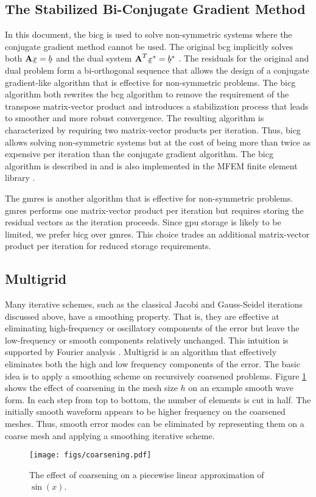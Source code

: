 \documentclass[../doc.tex]{subfiles}
\begin{document}
\subsection{The Stabilized Bi-Conjugate Gradient Method}
In this document, the \gls{bicg} is used to solve non-symmetric systems where the conjugate gradient method cannot be used. The original \gls{bcg} \cite{bicg,10.1007/BFb0080116} implicitly solves both $\mat{A}\ubar{x} = \ubar{b}$ and the dual system $\mat{A}^T \ubar{x}^* = \ubar{b}^*$ \cite{saad}. The residuals for the original and dual problem form a bi-orthogonal sequence that allows the design of a conjugate gradient-like algorithm that is effective for non-symmetric problems. The \gls{bicg} algorithm \cite{doi:10.1137/0913035} both rewrites the \gls{bcg} algorithm to remove the requirement of the transpose matrix-vector product and introduces a stabilization process that leads to smoother and more robust convergence. The resulting algorithm is characterized by requiring two matrix-vector products per iteration. Thus, \gls{bicg} allows solving non-symmetric systems but at the cost of being more than twice as expensive per iteration than the conjugate gradient algorithm. The \gls{bicg} algorithm is described in \textcite[p.~27]{siam_templates} and is also implemented in the MFEM finite element library \cite{mfem-paper}. 

The \gls{gmres} \cite{gmres} is another algorithm that is effective for non-symmetric problems. \gls{gmres} performs one matrix-vector product per iteration but requires storing the residual vectors as the iteration proceeds. Since \gls{gpu} storage is likely to be limited, we prefer \gls{bicg} over \gls{gmres}. This choice trades an additional matrix-vector product per iteration for reduced storage requirements. 

\subsection{Multigrid}
Many iterative schemes, such as the classical Jacobi and Gauss-Seidel iterations discussed above, have a smoothing property. That is, they are effective at eliminating high-frequency or oscillatory components of the error but leave the low-frequency or smooth components relatively unchanged. This intuition is supported by Fourier analysis \cite{multigrid_tutorial}. Multigrid is an algorithm that effectively eliminates both the high and low frequency components of the error. The basic idea is to apply a smoothing scheme on recursively coarsened problems. Figure \ref{fem:coarsening_diag} shows the effect of coarsening in the mesh size $h$ on an example smooth wave form. In each step from top to bottom, the number of elements is cut in half. The initially smooth waveform appears to be higher frequency on the coarsened meshes. Thus, smooth error modes can be eliminated by representing them on a coarse mesh and applying a smoothing iterative scheme. 
\begin{figure}
\centering
\texttt{[image: figs/coarsening.pdf]}
\caption{The effect of coarsening on a piecewise linear approximation of $\sin(x)$. }
\label{fem:coarsening_diag}
\end{figure}
\end{document}

